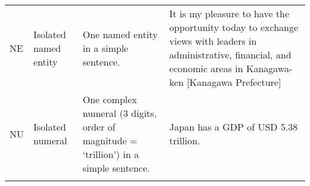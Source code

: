 \begin{sidewaystable}
\begin{tabularx}{\textwidth}{l>{\raggedright\arraybackslash}p{}QQ}
NE                   & Isolated named entity                                                & One named entity in a simple sentence.                                                                                                                                                                                                                                                                                                                                                                                                                      & It is my pleasure to have the opportunity today to exchange views with leaders in administrative, financial, and economic areas in Kanagawa-ken {[}Kanagawa Prefecture{]}                                                                                                                                                                                                                                                                                                       \\ \tablevspace

NU                   & Isolated numeral                                                                                               & One complex numeral (3 digits, order of magnitude = ‘trillion’) in a simple sentence.                                                                                                                                                                                                                                                                                                                             & Japan has a GDP of USD 5.38 trillion.                                                                                                                                                                                                                                                                                                                                                                                                                                                                                           \\ \tablevspace


\end{tabularx}
\end{sidewaystable}
